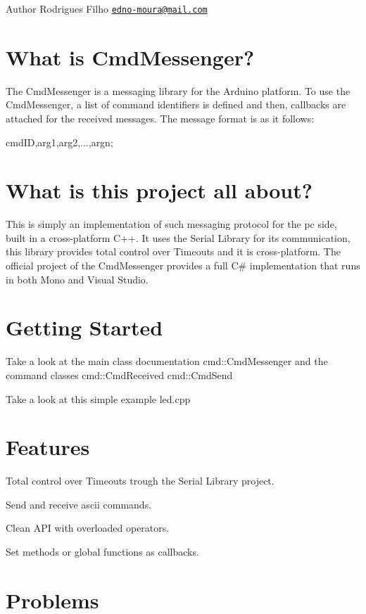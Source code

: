 \begin{DoxyAuthor}{Author}
Rodrigues Filho \href{mailto:edno-moura@mail.com}{\tt edno-\/moura@mail.\+com}
\end{DoxyAuthor}
\hypertarget{index_what_is}{}\section{What is Cmd\+Messenger?}\label{index_what_is}
The Cmd\+Messenger is a messaging library for the Arduino platform. To use the Cmd\+Messenger, a list of command identifiers is defined and then, callbacks are attached for the received messages. The message format is as it follows\+: 
\begin{DoxyPre}
  cmdID,arg1,arg2,...,argn;
\end{DoxyPre}
\hypertarget{index_this_project}{}\section{What is this project all about?}\label{index_this_project}
This is simply an implementation of such messaging protocol for the pc side, built in a cross-\/platform C++. It uses the Serial Library for its communication, this library provides total control over Timeouts and it is cross-\/platform. The official project of the Cmd\+Messenger provides a full C\# implementation that runs in both Mono and Visual Studio.\hypertarget{index_getting_started}{}\section{Getting Started}\label{index_getting_started}
Take a look at the main class documentation cmd\+::\+Cmd\+Messenger and the command classes cmd\+::\+Cmd\+Received cmd\+::\+Cmd\+Send

Take a look at this simple example led.\+cpp\hypertarget{index_features}{}\section{Features}\label{index_features}

\begin{DoxyItemize}
\item Total control over Timeouts trough the Serial Library project.
\item Send and receive ascii commands.
\item Clean A\+P\+I with overloaded operators.
\item Set methods or global functions as callbacks.
\end{DoxyItemize}\hypertarget{index_problems}{}\section{Problems}\label{index_problems}

